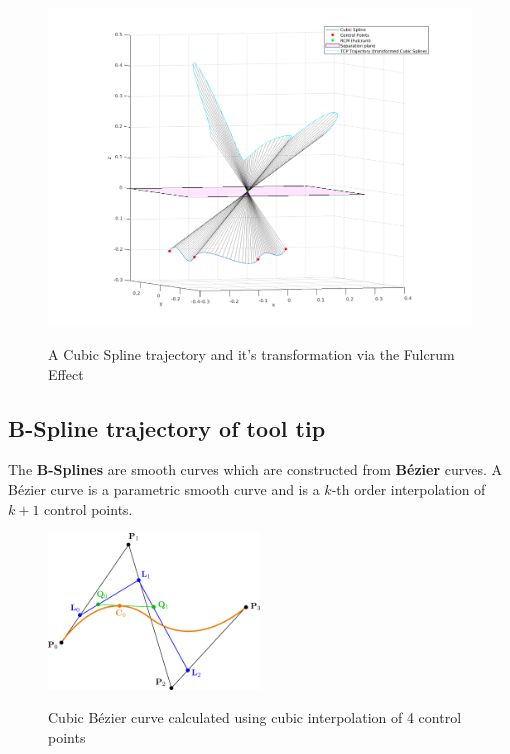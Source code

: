 \begin{center}
\begin{figure}[H]
\centering
\includegraphics[width=\textwidth]{images/rcm_trajectories/rcm_cubic_traj.png}\\
\caption{A Cubic Spline trajectory and it's transformation via the Fulcrum Effect}
\end{figure}
\end{center}


\subsection{B-Spline trajectory of tool tip}

The \textbf{B-Splines} are smooth curves which are constructed from \textbf{B\'ezier} curves. A B\'ezier curve is a parametric smooth curve and is a $k$-th order interpolation of $k+1$ control points.

\begin{center}
\begin{figure}[H]
\centering
\includegraphics[width=0.5\textwidth]{images/bezier-curve.png}\\
\caption{Cubic B\'ezier curve calculated using cubic interpolation of 4 control points} 
\end{figure}
\end{center}


